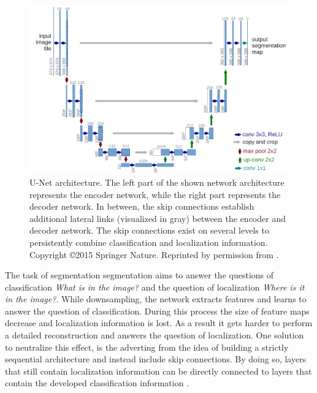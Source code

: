 \begin{figure}
	\includegraphics[width=\linewidth]{figures/chap223_unet.png}
	\caption[U-Net]{
		U-Net architecture. The left part of the shown network architecture represents the encoder network, while the right part represents the decoder network. 
		In between, the skip connections establish additional lateral links (visualized in gray) between the encoder and decoder network. 
		The skip connections exist on several levels to persistently combine classification and localization information. 
		Copyright \copyright 2015 Springer Nature. Reprinted by permission from \cite{RF15-U-Net}.}
	\label{fig:ch2:sec2:unet}
\end{figure}

The task of segmentation segmentation aims to answer the questions of classification \emph{What is in the image?} and the question of localization \emph{Where is it in the image?}.
While downsampling, the network extracts features and learns to answer the question of classification.
During this process the size of feature maps decrease and localization information is lost.
As a result it gets harder to perform a detailed reconstruction and answers the question of localization.
One solution to neutralize this effect, is the adverting from the idea of building a strictly sequential architecture and instead include skip connections.
By doing so, layers that still contain localization information can be directly connected to layers that contain the developed classification information \cite{LSD15-FCN}.

